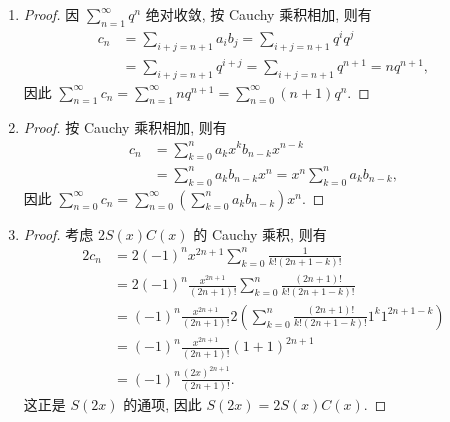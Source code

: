 % 
\begin{enumerate}
    \item %
        \begin{proof}
            因 $\sum\limits_{n=1}^\infty{q^n}$ 绝对收敛, 按 Cauchy 乘积相加, 则有
            \begin{align*}
                c_n &= \sum_{i+j=n+1}a_ib_j = \sum_{i+j=n+1}q^iq^j \\
                &= \sum_{i+j=n+1}q^{i+j} = \sum_{i+j=n+1}q^{n+1} = nq^{n+1},
            \end{align*}
            因此 $\sum\limits_{n=1}^\infty{c_n} = \sum\limits_{n=1}^\infty{nq^{n+1}} = \sum\limits_{n=0}^\infty{(n+1)q^n}$.
        \end{proof}
    \item %
        \begin{proof}
            按 Cauchy 乘积相加, 则有
            \begin{align*}
                c_n &= \sum_{k=0}^na_kx^{k}b_{n-k}x^{n-k} \\
                &= \sum_{k=0}^na_kb_{n-k}x^n = x^n\sum_{k=0}^na_kb_{n-k},
            \end{align*}
            因此 $\sum\limits_{n=0}^\infty{c_n} = \sum\limits_{n=0}^\infty\left(\sum\limits_{k=0}^na_kb_{n-k}\right)x^n$.
        \end{proof}
    \item %
        \begin{proof}
            考虑 $2S(x)C(x)$ 的 Cauchy 乘积, 则有
            \begin{align*}
                2c_n &= 2(-1)^nx^{2n+1}\sum_{k=0}^n\frac{1}{k!(2n+1-k)!} \\
                &= 2(-1)^n\frac{x^{2n+1}}{(2n+1)!}\sum_{k=0}^n\frac{(2n+1)!}{k!(2n+1-k)!} \\
                &= (-1)^n\frac{x^{2n+1}}{(2n+1)!}2\left(\sum_{k=0}^n\frac{(2n+1)!}{k!(2n+1-k)!}1^{k}1^{2n+1-k}\right) \\
                &= (-1)^n\frac{x^{2n+1}}{(2n+1)!}(1+1)^{2n+1} \\
                &= (-1)^n\frac{(2x)^{2n+1}}{(2n+1)!}.
            \end{align*}
            这正是 $S(2x)$ 的通项, 因此 $S(2x) = 2S(x)C(x)$.
        \end{proof}
\end{enumerate}
% 
